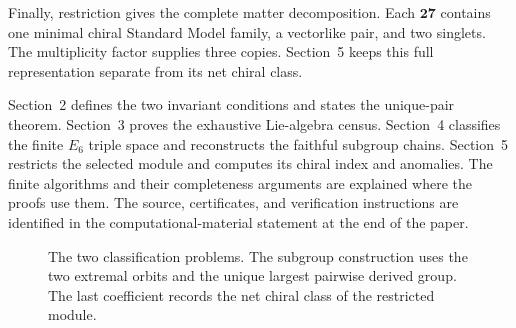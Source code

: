 \documentclass[11pt]{article}
\theoremstyle{remark}
\begin{document}
Finally, restriction gives the complete matter decomposition. Each
\(\mathbf{27}\) contains one minimal chiral Standard Model family, a
vectorlike pair, and two singlets. The multiplicity factor supplies three
copies. Section~5 keeps this full representation separate from its net
chiral class.

Section~2 defines the two invariant conditions and states the unique-pair
theorem.  Section~3 proves the exhaustive Lie-algebra census.  Section~4
classifies the finite \(E_6\) triple space and reconstructs the faithful
subgroup chains.  Section~5 restricts the selected module and computes its
chiral index and anomalies. The finite algorithms and their completeness
arguments are explained where the proofs use them. The source, certificates,
and verification instructions are identified in the computational-material
statement at the end of the paper.

\begin{figure}[H]
\centering
{}
\caption{The two classification problems. The subgroup construction uses
the two extremal orbits and the unique largest pairwise derived group. The last
coefficient records the net chiral class of the restricted module.}
\label{fig:logical-architecture}
\end{figure}
\end{document}
